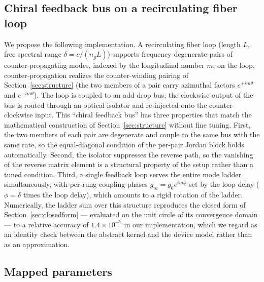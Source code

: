 \documentclass[11pt,a4paper]{article}
\begin{document}
\subsection{Chiral feedback bus on a recirculating fiber loop}

We propose the following implementation. A recirculating fiber loop (length
$L$, free spectral range $\delta = c / (n_g L)$) supports frequency-degenerate
pairs of counter-propagating modes, indexed by the longitudinal number $m$; on
the loop, counter-propagation realizes the counter-winding pairing of
Section~\ref{sec:structure} (the two members of a pair carry azimuthal factors
$e^{+i m \theta}$ and $e^{-i m \theta}$). The loop is coupled to an add-drop
bus; the clockwise output of the bus is routed through an optical isolator and
re-injected onto the counter-clockwise input. This ``chiral feedback bus'' has
three properties that match the mathematical construction of
Section~\ref{sec:structure} without fine tuning. First, the two members of each
pair are degenerate and couple to the same bus with the same rate, so the
equal-diagonal condition of the per-pair Jordan block holds automatically.
Second, the isolator suppresses the reverse path, so the vanishing of the
reverse matrix element is a structural property of the setup rather than a
tuned condition. Third, a single feedback loop serves the entire mode ladder
simultaneously, with per-rung coupling phases $g_m = g_0 e^{i m \phi}$ set by
the loop delay ($\phi = \delta$ times the loop delay), which amounts to a rigid
rotation of the ladder. Numerically, the ladder sum over this structure
reproduces the closed form of Section~\ref{sec:closedform} --- evaluated on the
unit circle of its convergence domain --- to a relative accuracy of
$1.4\times 10^{-7}$ in our implementation, which we regard as an identity check
between the abstract kernel and the device model rather than as an
approximation.

\subsection{Mapped parameters}
\end{document}
